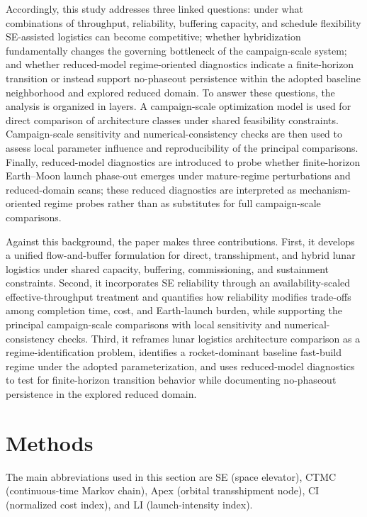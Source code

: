 \documentclass[12pt]{article}
\begin{document}
	Accordingly, this study addresses three linked questions: under what combinations of throughput, reliability, buffering capacity, and schedule flexibility SE-assisted logistics can become competitive; whether hybridization fundamentally changes the governing bottleneck of the campaign-scale system; and whether reduced-model regime-oriented diagnostics indicate a finite-horizon transition or instead support no-phaseout persistence within the adopted baseline neighborhood and explored reduced domain. To answer these questions, the analysis is organized in layers. A campaign-scale optimization model is used for direct comparison of architecture classes under shared feasibility constraints. Campaign-scale sensitivity and numerical-consistency checks are then used to assess local parameter influence and reproducibility of the principal comparisons. Finally, reduced-model diagnostics are introduced to probe whether finite-horizon Earth--Moon launch phase-out emerges under mature-regime perturbations and reduced-domain scans; these reduced diagnostics are interpreted as mechanism-oriented regime probes rather than as substitutes for full campaign-scale comparisons.
	
	Against this background, the paper makes three contributions. First, it develops a unified flow-and-buffer formulation for direct, transshipment, and hybrid lunar logistics under shared capacity, buffering, commissioning, and sustainment constraints. Second, it incorporates SE reliability through an availability-scaled effective-throughput treatment and quantifies how reliability modifies trade-offs among completion time, cost, and Earth-launch burden, while supporting the principal campaign-scale comparisons with local sensitivity and numerical-consistency checks. Third, it reframes lunar logistics architecture comparison as a regime-identification problem, identifies a rocket-dominant baseline fast-build regime under the adopted parameterization, and uses reduced-model diagnostics to test for finite-horizon transition behavior while documenting no-phaseout persistence in the explored reduced domain.

\section{Methods}

The main abbreviations used in this section are SE (space elevator), CTMC (continuous-time Markov chain), Apex (orbital transshipment node), CI (normalized cost index), and LI (launch-intensity index).
\end{document}
